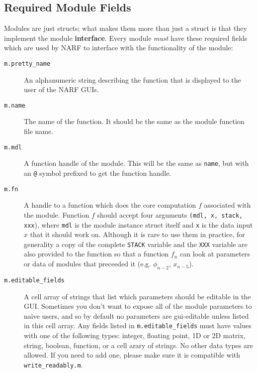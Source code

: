 \documentclass[letterpaper]{report}
\newcommand{\definition}[1]{\textbf{#1}}
\newcommand{\matlab}[1]{\texttt{#1}}
\begin{document}
\subsection{Required Module Fields}

Modules are just structs; what makes them more than just a struct is that they implement the module \definition{interface}. Every module \emph{must} have these required fields which are used by NARF to interface with the functionality of the module:

\begin{description}
\item [\matlab{m.pretty\_name}] An alphanumeric string describing the function that is displayed to the user of the NARF GUIs. 

\item [\matlab{m.name}] The name of the function. It should be the same as the module function file name. 

\item [\matlab{m.mdl}] A function handle of the module. This will be the same as \matlab{name}, but with an \matlab{@} symbol prefixed to get the function handle. 

\item [\matlab{m.fn}] A handle to a function which does the core computation $f$ associated with the module. Function $f$ should accept four arguments \matlab{(mdl, x, stack, xxx}), where \matlab{mdl} is the module instance struct itself and \matlab{x} is the data input $x$ that it should work on. Although it is rare to use them in practice, for generality a copy of the complete \matlab{STACK} variable and the \matlab{XXX} variable are also provided to the function so that a function $f_n$ can look at parameters or data of modules that preceeded it (e.g. $\phi_{n-2}$, $x_{n-5}$).

\item [\matlab{m.editable\_fields}] A cell array of strings that list which parameters should be editable in the GUI. Sometimes you don't want to expose all of the module parameters to naive users, and so by default no parameters are gui-editable unless listed in this cell array. Any fields listed in \matlab{m.editable\_fields} must have values with one of the following types: integer, floating point, 1D or 2D matrix, string, boolean, function, or a cell arary of strings. No other data types are allowed. If you need to add one, please make sure it is compatible with \matlab{write\_readably.m}.


\end{description}
\end{document}
